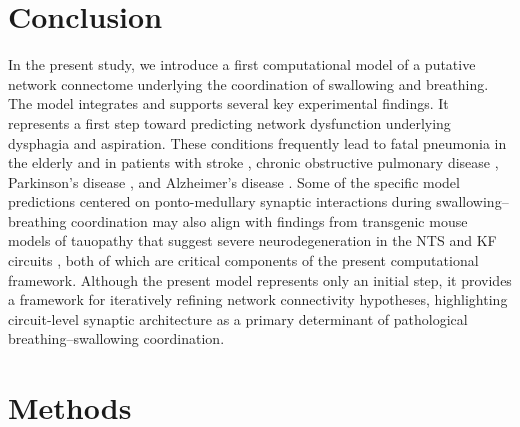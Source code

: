 \documentclass[pdflatex,sn-mathphys-ay]{sn-jnl}%
\theoremstyle{thmstyleone}%
\theoremstyle{thmstyletwo}%
\theoremstyle{thmstylethree}%
\begin{document}
\section{Conclusion}\label{Conclusion}
In the present study, we introduce a first computational model of a putative network connectome underlying the coordination of swallowing and breathing. The model integrates and supports several key experimental findings. It represents a first step toward predicting network dysfunction underlying dysphagia and aspiration. These conditions frequently lead to fatal pneumonia in the elderly \citep{finiels2001deglutition, easterling2008dementia} and in patients with stroke \citep{leslie2002swallow}, chronic obstructive pulmonary disease \citep{gross2009coordination, nagami2017breathing}, Parkinson’s disease \citep{gross2008coordination}, and Alzheimer’s disease \citep{seccil2016dysphagia}.
Some of the specific model predictions centered on ponto-medullary synaptic interactions during swallowing–breathing coordination may also align with findings from transgenic mouse models of tauopathy that suggest severe neurodegeneration in the NTS and KF circuits \citep{rub2001autonomic, dutschmann2010upper, menuet2011raphe}, both of which are critical components of the present computational framework.
Although the present model represents only an initial step, it provides a framework for iteratively refining network connectivity hypotheses, highlighting circuit-level synaptic architecture as a primary determinant of pathological breathing–swallowing coordination.


\section{Methods}\label{Methods}
\end{document}
